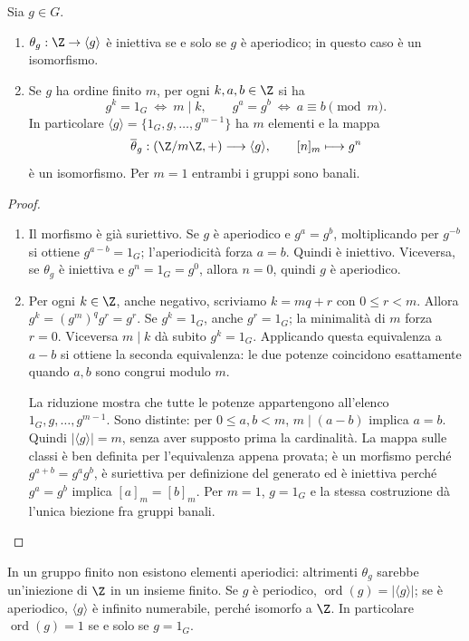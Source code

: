 \begin{proposizione}\label{prop:ordine-potenze}
Sia $g\in G$.
\begin{enumerate}[label=\arabic*.]
\item $\theta_g:\Z\to\langle g\rangle$ è iniettiva se e solo se $g$ è aperiodico; in questo caso è un isomorfismo.
\item Se $g$ ha ordine finito $m$, per ogni $k,a,b\in\Z$ si ha
\[
g^k=1_G\ \Longleftrightarrow\ m\mid k,
\qquad
g^a=g^b\ \Longleftrightarrow\ a\equiv b\pmod m.
\]
In particolare $\langle g\rangle=\{1_G,g,\ldots,g^{m-1}\}$ ha $m$ elementi e la mappa
\[
\overline\theta_g:(\Z/m\Z,+)\longrightarrow\langle g\rangle,
\qquad[n]_m\longmapsto g^n
\]
è un isomorfismo. Per $m=1$ entrambi i gruppi sono banali.
\end{enumerate}
\end{proposizione}
\begin{proof}
\begin{enumerate}[label=\arabic*.]
\item Il morfismo è già suriettivo. Se $g$ è aperiodico e $g^a=g^b$, moltiplicando per $g^{-b}$ si ottiene $g^{a-b}=1_G$; l'aperiodicità forza $a=b$. Quindi è iniettivo. Viceversa, se $\theta_g$ è iniettiva e $g^n=1_G=g^0$, allora $n=0$, quindi $g$ è aperiodico.
\item Per ogni $k\in\Z$, anche negativo, scriviamo $k=mq+r$ con $0\le r<m$. Allora $g^k=(g^m)^qg^r=g^r$. Se $g^k=1_G$, anche $g^r=1_G$; la minimalità di $m$ forza $r=0$. Viceversa $m\mid k$ dà subito $g^k=1_G$. Applicando questa equivalenza a $a-b$ si ottiene la seconda equivalenza: le due potenze coincidono esattamente quando $a,b$ sono congrui modulo $m$.

La riduzione mostra che tutte le potenze appartengono all'elenco $1_G,g,\ldots,g^{m-1}$. Sono distinte: per $0\le a,b<m$, $m\mid(a-b)$ implica $a=b$. Quindi $|\langle g\rangle|=m$, senza aver supposto prima la cardinalità. La mappa sulle classi è ben definita per l'equivalenza appena provata; è un morfismo perché $g^{a+b}=g^ag^b$, è suriettiva per definizione del generato ed è iniettiva perché $g^a=g^b$ implica $[a]_m=[b]_m$. Per $m=1$, $g=1_G$ e la stessa costruzione dà l'unica biezione fra gruppi banali.
\end{enumerate}
\end{proof}

In un gruppo finito non esistono elementi aperiodici: altrimenti $\theta_g$ sarebbe un'iniezione di $\Z$ in un insieme finito. Se $g$ è periodico, $\operatorname{ord}(g)=|\langle g\rangle|$; se è aperiodico, $\langle g\rangle$ è infinito numerabile, perché isomorfo a $\Z$. In particolare $\operatorname{ord}(g)=1$ se e solo se $g=1_G$.

